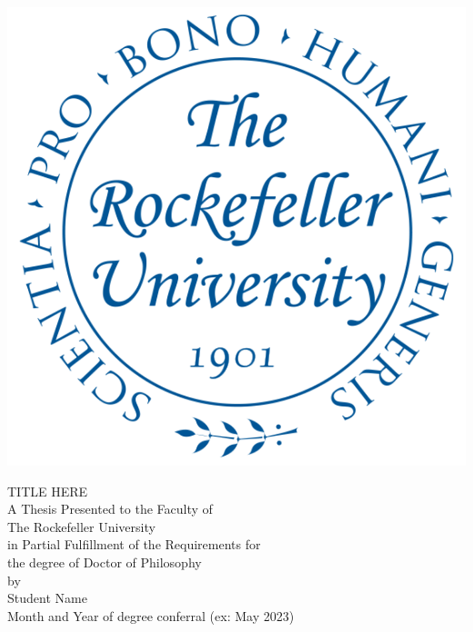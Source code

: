   
\begin{titlepage}
\begin{center}

\begin{singlespacing}
\vspace*{2\baselineskip}
\includegraphics[width = 1.75 in]{figures/Seal-blue.png}\\
\vspace*{5\baselineskip}

TITLE HERE\\ %

\vspace{8\baselineskip}
A Thesis Presented to the Faculty of\\
The Rockefeller University\\
in Partial Fulfillment of the Requirements for\\
the degree of Doctor of Philosophy\\
\vspace{8\baselineskip}
by\\
Student Name\\ %
Month and Year of degree conferral (ex: May 2023) %
\vspace{3\baselineskip}
\vfill


\end{singlespacing}

\end{center}
\end{titlepage}


